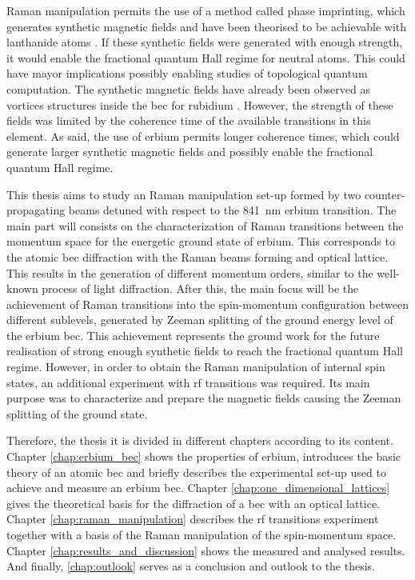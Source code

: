 Raman manipulation permits the use of a method called phase imprinting, which generates synthetic magnetic fields and have been theorised to be achievable with lanthanide atoms \cite{cui2013synthetic}. If these synthetic fields were generated with enough strength, it would enable the fractional quantum Hall regime for neutral atoms. This could have mayor implications possibly enabling studies of topological quantum computation. The synthetic magnetic fields have already been observed as vortices structures inside the \ac{bec} for rubidium \cite{Lin2009}. However, the strength of these fields was limited by the coherence time of the available transitions in this element. As said, the use of erbium permits longer coherence times, which could generate larger synthetic magnetic fields and possibly enable the fractional quantum Hall regime.

This thesis aims to study an Raman manipulation set-up formed by two counter-propagating beams detuned with respect to the \SI{841}{\nano\meter} erbium transition. The main part will consists on the characterization of Raman transitions between the momentum space for the energetic ground state of erbium. This corresponds to the atomic \ac{bec} diffraction with the Raman beams forming and optical lattice. This results in the generation of different momentum orders, similar to the well-known process of light diffraction. After this, the main focus will be the achievement of Raman transitions into the spin-momentum configuration between different sublevels, generated by Zeeman splitting of the ground energy level of the erbium \ac{bec}. This achievement represents the ground work for the future realisation of strong enough synthetic fields to reach the fractional quantum Hall regime. However, in order to obtain the Raman manipulation of internal spin states, an additional experiment with \ac{rf} transitions was required. Its main purpose was to characterize and prepare the magnetic fields causing the Zeeman splitting of the ground state.

Therefore, the thesis it is divided in different chapters according to its content. Chapter \ref{chap:erbium_bec} shows the properties of erbium, introduces the basic theory of an atomic \ac{bec} and briefly describes the experimental set-up used to achieve and measure an erbium \ac{bec}. Chapter \ref{chap:one_dimensional_lattices} gives the theoretical basis for the diffraction of a \ac{bec} with an optical lattice. Chapter \ref{chap:raman_manipulation} describes the \ac{rf} transitions experiment together with a basis of the Raman manipulation of the spin-momentum space. Chapter \ref{chap:results_and_discussion} shows the measured and analysed results. And finally, \ref{chap:outlook} serves as a conclusion and outlook to the thesis.

